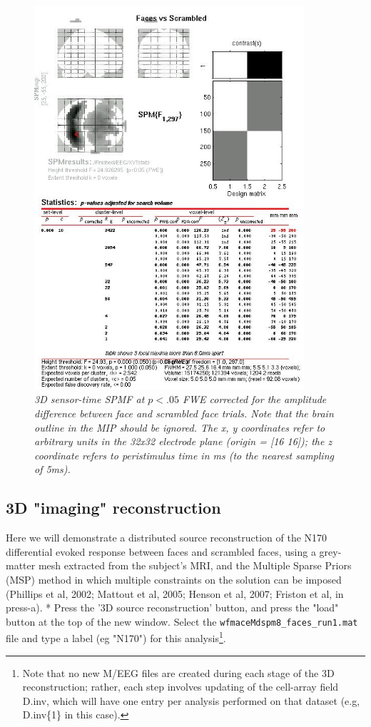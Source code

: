 \begin{figure}
\begin{center}
\includegraphics[width=100mm]{multimodal/figures/figure_32_7}
\caption{\em 3D sensor-time SPM{F} at $p<.05$ FWE corrected for the amplitude difference between face and scrambled face trials. Note that the brain outline in the MIP should be ignored. The x, y coordinates refer to arbitrary units in the 32x32 electrode plane (origin = [16 16]); the z coordinate refers to peristimulus time in ms (to the nearest sampling of 5ms). \label{fig_32_7}}
\end{center}
\end{figure}

\subsection{3D "imaging" reconstruction \label{3D}}

Here we will demonstrate a distributed source reconstruction of the N170 differential evoked response between faces and scrambled faces, using a grey-matter mesh extracted from the subject's MRI, and the Multiple Sparse Priors (MSP) method in which multiple constraints on the solution can be imposed (Phillips et al, 2002; Mattout et al, 2005; Henson et al, 2007; Friston et al, in press-a).
* Press the '3D source reconstruction' button, and press the "load" button at the top of the new window. Select the \verb!wfmaceMdspm8_faces_run1.mat! file and type a label (eg "N170") for this analysis\footnote{Note that no new M/EEG files are created during each stage of the 3D reconstruction; rather, each step involves updating of the cell-array field D.inv, which will have one entry per analysis performed on that dataset (e.g, D.inv\{1\} in this case).}.

